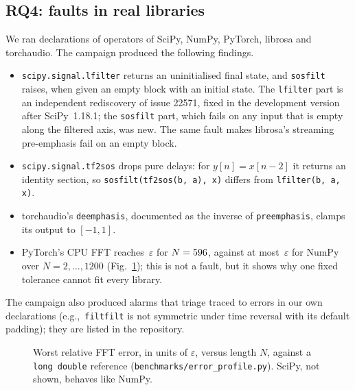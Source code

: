\documentclass[10pt,conference]{IEEEtran}
\newcommand{\eps}{\varepsilon}
\newcommand{\code}[1]{\texttt{#1}}
\newcommand{\eg}{e.g.,\ }
\begin{document}
\subsection{RQ4: faults in real libraries}
\label{sec:rq4}
We ran declarations of \campaignTargets{} operators of SciPy, NumPy, PyTorch,
librosa and torchaudio. The campaign produced the following findings.
\begin{itemize}
\item \code{scipy.signal.lfilter} returns an uninitialised final state, and
\code{sosfilt} raises, when given an empty block with an initial state. The
\code{lfilter} part is an independent rediscovery of issue 22571, fixed in the
development version after SciPy~1.18.1; the \code{sosfilt} part, which fails on
any input that is empty along the filtered axis, was new. The same fault makes
librosa's streaming pre-emphasis fail on an empty block.
\item \code{scipy.signal.tf2sos} drops pure delays: for $y[n]=x[n-2]$ it
returns an identity section, so \code{sosfilt(tf2sos(b, a), x)} differs from
\code{lfilter(b, a, x)}.
\item torchaudio's \code{deemphasis}, documented as the inverse of
\code{preemphasis}, clamps its output to $[-1,1]$.
\item PyTorch's CPU FFT reaches \torchMaxEps$\,\eps$ for $N=596$, against at most
\numpyMaxEps$\,\eps$ for NumPy over $N=2,\dots,1200$
(Fig.~\ref{fig:profile}); this is not a fault, but it shows why one fixed
tolerance cannot fit every library.
\end{itemize}
The campaign also produced \campaignTriaged{} alarms that triage traced to
errors in our own declarations (\eg \code{filtfilt} is not symmetric under time
reversal with its default padding); they are listed in the repository.

\begin{figure}[t]
\centering
{}
\caption{Worst relative FFT error, in units of $\eps$, versus length $N$, against a
\code{long double} reference (\code{benchmarks/error\_profile.py}). SciPy, not shown,
behaves like NumPy.}
\label{fig:profile}
\end{figure}
\end{document}
